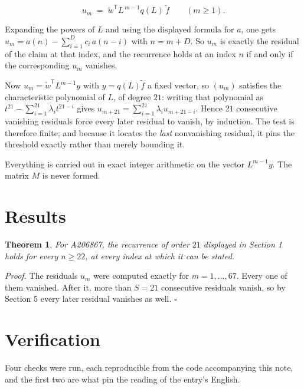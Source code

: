 \documentclass[11pt]{article}
\newtheorem{theorem}{Theorem}
\theoremstyle{definition}
\begin{document}
\[u_m \;=\; \tilde w^{\mathsf T} L^{\,m-1} q(L)\,\tilde f \qquad (m \ge 1).\]

Expanding the powers of $L$ and using the displayed formula for $a$, one gets $u_m = a(n) - \sum_{i=1}^{D} c_i\,a(n-i)$ with $n = m + D$. So $u_m$ is exactly the residual of the claim at that index, and the recurrence holds at an index $n$ if and only if the corresponding $u_m$ vanishes.

Now $u_m = \tilde w^{\mathsf T} L^{m-1} y$ with $y = q(L)\tilde f$ a fixed vector, so $(u_m)$ satisfies the characteristic polynomial of $L$, of degree $21$: writing that polynomial as $t^{21} - \sum_{i=1}^{21} \lambda_i t^{21-i}$ gives $u_{m+21} = \sum_{i=1}^{21} \lambda_i u_{m+21-i}$. Hence $21$ consecutive vanishing residuals force every later residual to vanish, by induction. The test is therefore finite; and because it locates the {\itshape last} nonvanishing residual, it pins the threshold exactly rather than merely bounding it.

Everything is carried out in exact integer arithmetic on the vector $L^{m-1}y$. The matrix $M$ is never formed.

\section{Results}

\begin{theorem} For A206867, the recurrence of order $21$ displayed in Section 1 holds for every $n \ge 22$, at every index at which it can be stated.\end{theorem}

{\itshape Proof.} The residuals $u_m$ were computed exactly for $m = 1,\dots,67$. Every one of them vanished. After it, more than $S = 21$ consecutive residuals vanish, so by Section 5 every later residual vanishes as well. $\square$

\section{Verification}

Four checks were run, each reproducible from the code accompanying this note, and the first two are what pin the reading of the entry's English.
\end{document}
